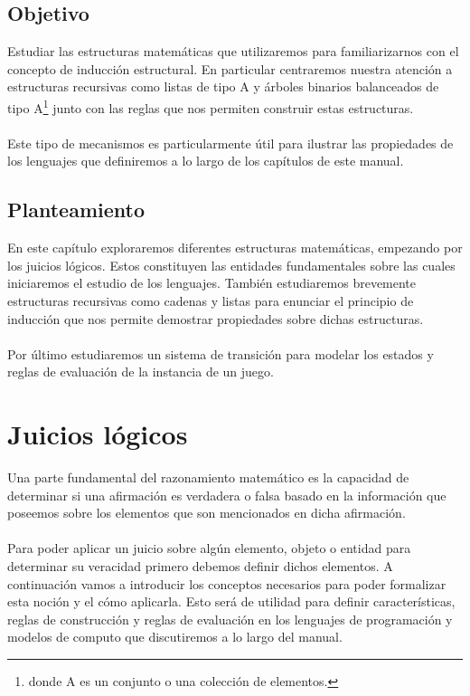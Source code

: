 \subsection*{Objetivo}
Estudiar las estructuras matemáticas que utilizaremos para familiarizarnos con el concepto de inducción estructural. En particular centraremos nuestra atención a estructuras recursivas como listas de tipo A y árboles binarios balanceados de tipo A\footnote{donde A es un conjunto o una colección de elementos.} junto con las reglas que nos permiten construir estas estructuras.\\\\
Este tipo de mecanismos es particularmente útil para ilustrar las propiedades de los lenguajes que definiremos a lo largo de los capítulos de este manual.

\subsection*{Planteamiento}
En este capítulo exploraremos diferentes estructuras matemáticas, empezando por los juicios lógicos. Estos constituyen las entidades fundamentales sobre las cuales iniciaremos el estudio de los lenguajes.
También estudiaremos brevemente estructuras recursivas como cadenas y listas para enunciar el principio de inducción que nos permite demostrar propiedades sobre dichas estructuras.\\\\ Por último estudiaremos un sistema de transición para modelar los estados y reglas de evaluación de la instancia de un juego.

\section{Juicios lógicos}

    Una parte fundamental del razonamiento matemático es la capacidad de determinar si una afirmación es verdadera o falsa basado en la información que poseemos sobre los elementos que son mencionados en dicha afirmación. \\\\
    Para poder aplicar un juicio sobre algún elemento, objeto o entidad para determinar su veracidad primero debemos definir dichos elementos. A continuación vamos a introducir los conceptos necesarios para poder formalizar esta noción y el cómo aplicarla. Esto será de utilidad para definir características, reglas de construcción y reglas de evaluación en los lenguajes de programación y modelos de computo que discutiremos a lo largo del manual.\\

